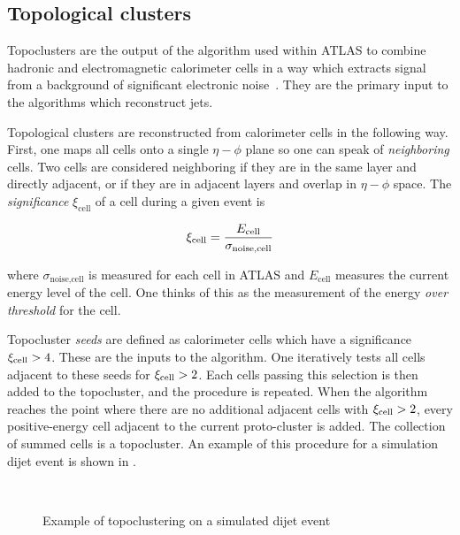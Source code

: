 \subsection{Topological clusters}\label{sec:topoclusters}

Topoclusters are the output of the algorithm used within ATLAS to combine hadronic and electromagnetic calorimeter cells in a way which extracts signal from a background of significant electronic noise~\cite{PERF-2014-07}.
They are the primary input to the algorithms which reconstruct jets.

Topological clusters are reconstructed from calorimeter cells in the following way.
First, one maps all cells onto a single $\eta-\phi$ plane so one can speak of \textit{neighboring} cells.
Two cells are considered neighboring if they are in the same layer and directly adjacent, or if they are in adjacent layers and overlap in $\eta-\phi$ space.
The \textit{significance} $\xi_{\text{cell}}$ of a cell during a given event is

\begin{equation}
\xi_{\text{cell}} = \frac{E_{\text{cell}}}{\sigma_{\text{noise,cell}}}
\end{equation}

where $\sigma_{\text{noise,cell}}$ is measured for each cell in ATLAS and $E_{\text{cell}}$ measures the current energy level of the cell.
One thinks of this as the measurement of the energy \textit{over threshold} for the cell.

Topocluster \textit{seeds} are defined as calorimeter cells which have a significance $\xi_{\text{cell}} > 4 $.
These are the inputs to the algorithm.
One iteratively tests all cells adjacent to these seeds for $\xi_{\text{cell}} > 2$.
Each cells passing this selection is then added to the topocluster, and the procedure is repeated.
When the algorithm reaches the point where there are no additional adjacent cells with $\xi_{\text{cell}} > 2$, every positive-energy cell adjacent to the current proto-cluster is added.
The collection of summed cells is a topocluster.
An example of this procedure for a simulation dijet event is shown in .
\begin{figure}
\caption{Example of topoclustering on a simulated dijet event} \label{fig:topocluster}
 \\
\end{figure}

